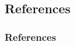 \documentclass{beamer}
\begin{document}
\begin{CJK*}{UTF8}{bsmi}
    \section{References}
    \begin{frame}[t, allowframebreaks]
        \frametitle{References}
        \renewcommand*{\bibfont}{\scriptsize}
        \printbibliography
    \end{frame}

\end{CJK*}
\end{document}
